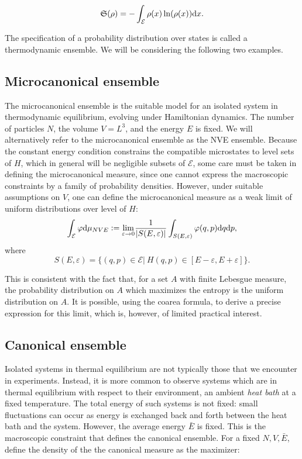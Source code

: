 \begin{equation}
    \label{eq:entropy}
    \mathfrak S(\rho)=-\int_{\mathcal E} \rho(x)\ln(\rho(x))\mathrm{d}x.
\end{equation}

The specification of a probability distribution over states is called a thermodynamic ensemble. We will be considering the following two examples.

\subsection{Microcanonical ensemble}

    The microcanonical ensemble is the suitable model for an isolated system in thermodynamic equilibrium, evolving under Hamiltonian dynamics. The number of particles $N$, the volume $V=L^3$, and the energy $E$ is fixed. We will alternatively refer to the microcanonical ensemble as the NVE ensemble.
     Because the constant energy condition constrains the compatible microstates to level sets of $H$, which in general will be negligible subsets of $\mathcal E$, some care must be taken in defining the microcanonical measure, since one cannot express the macroscopic constraints by a family of probability densities.
      However, under suitable assumptions on $V$, one can define the microcanonical measure as a weak limit of uniform distributions over level  of $H$:
    $$\int_\mathcal{E} \varphi \mathrm{d}\mu_{NVE} \mathrel{\mathop:}= \underset{\varepsilon \to 0}{\mathrm{lim}} \frac{1}{|S(E,\varepsilon)|}\int_{S(E,\varepsilon)} \varphi(q,p) \mathrm{d} q \mathrm{d} p,$$
    where 
    $$S(E,\varepsilon) = \{ (q,p) \in \mathcal E |\ H(q,p) \in [E-\varepsilon,E+\varepsilon]\}.$$
    
    This is consistent with the fact that, for a set $A$ with finite Lebesgue measure, the probability distribution on $A$ which maximizes the entropy is the uniform distribution on $A$. 
    It is possible, using the coarea formula, to derive a precise expression for this limit, which is, however, of limited practical interest.
    


\subsection{Canonical ensemble}\label{par:canonical ensemble}
    Isolated systems in thermal equilibrium are not typically those that we encounter in experiments. Instead, it is more common to observe systems which are in thermal equilibrium with respect to their environment, an ambient \textit{heat bath} at a fixed temperature.
    The total energy of such systems is not fixed: small fluctuations can occur as energy is exchanged back and forth between the heat bath and the system. However, the average energy $\bar E$ is fixed. 
    This is the macroscopic constraint that defines the canonical ensemble. For a fixed $N,V,\bar E$, define the density of the the canonical measure as the maximizer:

